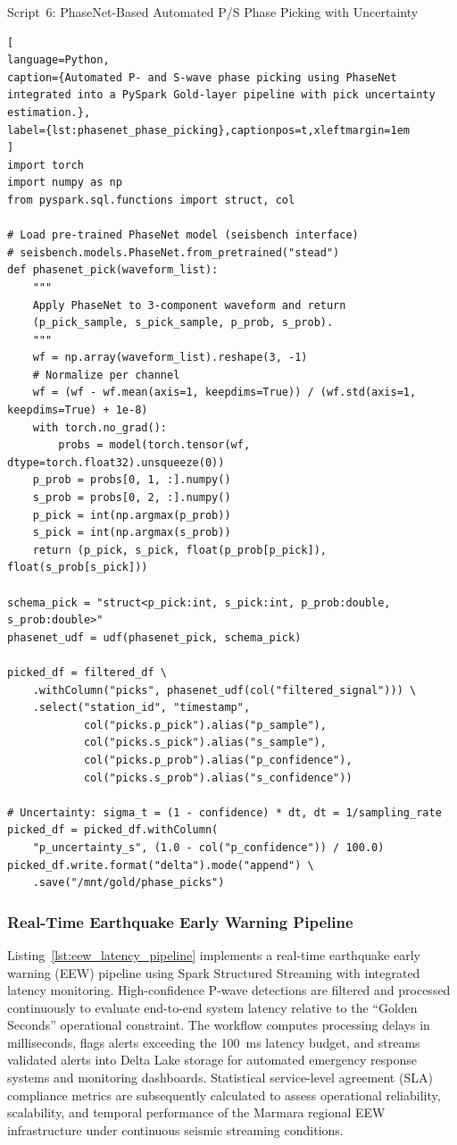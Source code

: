 \documentclass[data,article,accept,pdftex,moreauthors]{Definitions/mdpi}
\begin{document}
Script~6: PhaseNet-Based Automated P/S Phase Picking with Uncertainty

\begin{lstlisting}[
language=Python,
caption={Automated P- and S-wave phase picking using PhaseNet integrated into a PySpark Gold-layer pipeline with pick uncertainty estimation.},
label={lst:phasenet_phase_picking},captionpos=t,xleftmargin=1em
]
import torch
import numpy as np
from pyspark.sql.functions import struct, col

# Load pre-trained PhaseNet model (seisbench interface)
# seisbench.models.PhaseNet.from_pretrained("stead")
def phasenet_pick(waveform_list):
    """
    Apply PhaseNet to 3-component waveform and return
    (p_pick_sample, s_pick_sample, p_prob, s_prob).
    """
    wf = np.array(waveform_list).reshape(3, -1)
    # Normalize per channel
    wf = (wf - wf.mean(axis=1, keepdims=True)) / (wf.std(axis=1, keepdims=True) + 1e-8)
    with torch.no_grad():
        probs = model(torch.tensor(wf, dtype=torch.float32).unsqueeze(0))
    p_prob = probs[0, 1, :].numpy()
    s_prob = probs[0, 2, :].numpy()
    p_pick = int(np.argmax(p_prob))
    s_pick = int(np.argmax(s_prob))
    return (p_pick, s_pick, float(p_prob[p_pick]), float(s_prob[s_pick]))

schema_pick = "struct<p_pick:int, s_pick:int, p_prob:double, s_prob:double>"
phasenet_udf = udf(phasenet_pick, schema_pick)

picked_df = filtered_df \
    .withColumn("picks", phasenet_udf(col("filtered_signal"))) \
    .select("station_id", "timestamp",
            col("picks.p_pick").alias("p_sample"),
            col("picks.s_pick").alias("s_sample"),
            col("picks.p_prob").alias("p_confidence"),
            col("picks.s_prob").alias("s_confidence"))

# Uncertainty: sigma_t = (1 - confidence) * dt, dt = 1/sampling_rate
picked_df = picked_df.withColumn(
    "p_uncertainty_s", (1.0 - col("p_confidence")) / 100.0)
picked_df.write.format("delta").mode("append") \
    .save("/mnt/gold/phase_picks")
\end{lstlisting}

\subsubsection{Real-Time Earthquake Early Warning Pipeline}

Listing~\ref{lst:eew_latency_pipeline} implements a real-time earthquake early warning (EEW) pipeline using Spark Structured Streaming with integrated latency monitoring. High-confidence P-wave detections are filtered and processed continuously to evaluate end-to-end system latency relative to the ``Golden Seconds'' operational constraint. The workflow computes processing delays in milliseconds, flags alerts exceeding the 100~ms latency budget, and streams validated alerts into Delta Lake storage for automated emergency response systems and monitoring dashboards. Statistical service-level agreement (SLA) compliance metrics are subsequently calculated to assess operational reliability, scalability, and temporal performance of the Marmara regional EEW infrastructure under continuous seismic streaming conditions.
\end{document}
